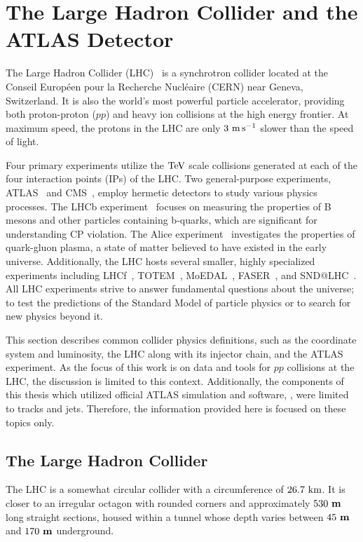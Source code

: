 
\chapter{The Large Hadron Collider and the ATLAS Detector}
\label{ch:lhc_atlas_detector}

The Large Hadron Collider (LHC)~\cite{LHCMachine,LHC1,LHC2, LHC3} is a synchrotron collider located at the Conseil Européen pour la Recherche Nucléaire (CERN) near Geneva, Switzerland.
It is also the world's most powerful particle accelerator, providing both proton-proton ($pp$) and heavy ion collisions at the high energy frontier.
At maximum speed, the protons in the LHC are only $3~\mps$ slower than the speed of light.

Four primary experiments utilize the $\TeV$ scale collisions generated at each of the four interaction points (IPs) of the LHC.
Two general-purpose experiments, ATLAS~\cite{ATLAS} and CMS~\cite{CMS}, employ hermetic detectors to study various physics processes.
The LHCb experiment~\cite{LHCb} focuses on measuring the properties of B mesons and other particles containing b-quarks, which are significant for understanding CP violation.
The Alice experiment~\cite{ALICE} investigates the properties of quark-gluon plasma, a state of matter believed to have existed in the early universe.
Additionally, the LHC hosts several smaller, highly specialized experiments including LHCf~\cite{LHCf}, TOTEM~\cite{TOTEM}, MoEDAL~\cite{MoEDAL}, FASER~\cite{FASER}, and SND@LHC~\cite{SNDLHC}.
All LHC experiments strive to answer fundamental questions about the universe; to test the predictions of the Standard Model of particle physics or to search for new physics beyond it.

This section describes common collider physics definitions, such as the coordinate system and luminosity,
the LHC along with its injector chain, and the ATLAS experiment.
As the focus of this work is on data and tools for $pp$ collisions at the LHC, the discussion is limited to this context.
Additionally, the components of this thesis which utilized official ATLAS simulation and software, , were limited to tracks and jets.
Therefore, the information provided here is focused on these topics only.

\section{The Large Hadron Collider}

The LHC is a somewhat circular collider with a circumference of $26.7~\km$.
It is closer to an irregular octagon with rounded corners and approximately $ 530~\mathbf{m} $ long straight sections, housed within a tunnel whose depth varies between $45~\mathbf{m}$ and $170~\mathbf{m}$ underground.

